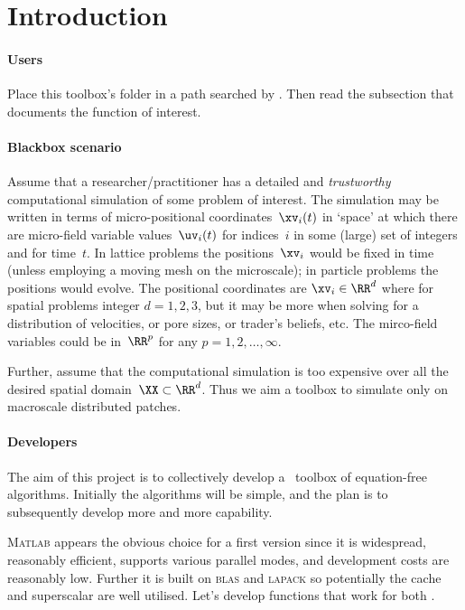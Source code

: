 \section{Introduction}

\paragraph{Users}
Place this toolbox's folder in a path searched by \script.
Then read the subsection that documents the function of interest.


\paragraph{Blackbox scenario}
Assume that a researcher\slash practitioner has a detailed and \emph{trustworthy} computational simulation of some problem of interest.
The simulation may be written in terms of micro-positional coordinates~\(\xv_i(t)\) in `space' at which there are micro-field variable values~\(\uv_i(t)\) for indices~\(i\) in some (large) set of integers and for time~\(t\).
In lattice problems the positions~\(\xv_i\) would be fixed in time (unless employing a moving mesh on the microscale); in particle problems the positions would evolve.
The positional coordinates are \(\xv_i\in\RR^{d}\) where for spatial problems integer \(d=1,2,3\), but it may be more when solving for a distribution of velocities, or pore sizes, or trader's beliefs, etc.
The mirco-field variables could be in~\(\RR^{p}\) for any \(p=1,2,\ldots,\infty\).

Further, assume that the computational simulation is too expensive over all the desired spatial domain~\(\XX\subset\RR^{d}\).
Thus we aim a toolbox to simulate only on macroscale distributed patches.



\paragraph{Developers}
The aim of this project is to collectively develop a \script\ toolbox of equation-free algorithms.
Initially the algorithms will be simple, and the plan is to subsequently develop more and more capability.

\textsc{Matlab} appears the obvious choice for a first version since it is widespread, reasonably efficient, supports various parallel modes, and development costs are reasonably low.
Further it is built on \textsc{blas} and \textsc{lapack} so potentially the cache and superscalar \cpu{} are well utilised.
Let's develop functions that work for both \script.




